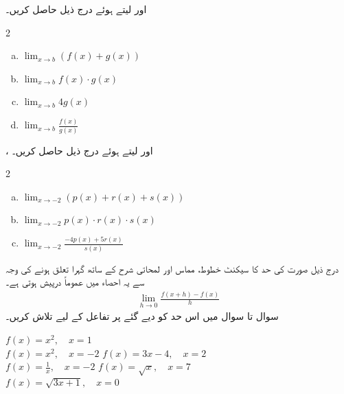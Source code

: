  اور  لیتے ہوئے درج ذیل حاصل کریں۔
\begin{multicols}{2}
\begin{enumerate}[a.]
\item
$\lim_{x\to b} (f(x)+g(x))$
\item
$\lim_{x\to b} f(x)\cdot g(x)$
\item
$\lim_{x\to b} 4g(x)$
\item
$\lim_{x\to b} \tfrac{f(x)}{g(x)}$
\end{enumerate}
\end{multicols}
،  اور  لیتے ہوئے درج ذیل حاصل کریں۔
\begin{multicols}{2}
\begin{enumerate}[a.]
\item
$\lim_{x\to -2} (p(x)+r(x)+s(x))$
\item
$\lim_{x\to -2} p(x)\cdot r(x)\cdot s(x)$
\item
$\lim_{x\to -2} \tfrac{-4p(x)+5r(x)}{s(x)}$
\end{enumerate}
\end{multicols}

درج ذیل صورت کی  حد کا سیکنٹ خطوط، مماس اور لمحاتی شرح کے ساتھ گہرا تعلق ہونے کی وجہ سے یہ احصاء میں عموماً درپیش ہوتی ہے۔
\begin{align*}
\lim_{h\to 0}\frac{f(x+h)-f(x)}{h}
\end{align*}
سوال  تا سوال  میں اس حد کو دیے گئے  پر تفاعل  کے لیے تلاش کریں۔

$f(x)=x^2,\quad x=1$\\
$f(x)=x^2,\quad x=-2$
$f(x)=3x-4,\quad x=2$\\
$f(x)=\tfrac{1}{x},\quad x=-2$
$f(x)=\sqrt{x},\quad x=7$\\
$f(x)=\sqrt{3x+1},\quad x=0$

